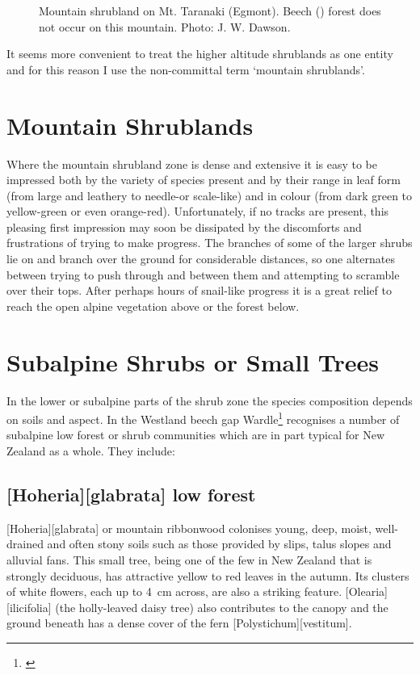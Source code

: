 \begin{figure}[htb]
\begin{minipage}[t]{0.284\textwidth}
    	\caption[Mountain shrubland on Mt.
    	Taranaki]{Mountain shrubland on Mt.
    	Taranaki (Egmont).
    	Beech () forest does not occur on this mountain.
    	Photo: J. W. Dawson.}%
    	\label{fig:91shrubland}
	\end{minipage}
\end{figure}

It seems more convenient to treat the higher altitude shrublands as one entity and for this reason I use the non-committal term `mountain shrublands'.

\section{Mountain Shrublands}

Where the mountain shrubland zone is dense and extensive it is easy to be impressed both by the variety of species present and by their range in leaf form (from large and leathery to needle-or scale-like) and in colour (from dark green to yellow-green or even orange-red).
Unfortunately, if no tracks are present, this pleasing first impression may soon be dissipated by the discomforts and frustrations of trying to make progress.
The branches of some of the larger shrubs lie on and branch over the ground for considerable distances, so one alternates between trying to push through and between them and attempting to scramble over their tops.
After perhaps hours of snail-like progress it is a great relief to reach the open alpine vegetation above or the forest below.

\section{Subalpine Shrubs or Small Trees}

In the lower or subalpine parts of the shrub zone the species composition depends on soils and aspect.
In the Westland beech gap Wardle\footnote{\cite{wardle1977plant}} recognises a number of subalpine low forest or shrub communities which are in part typical for New Zealand as a whole.
They include:

\subsection[\emph{Hoheria glabrata} low forest]{[Hoheria][glabrata] low forest}

[Hoheria][glabrata] or mountain ribbonwood colonises young, deep, moist, well-drained and often stony soils such as those provided by slips, talus slopes and alluvial fans.
This small tree, being one of the few in New Zealand that is strongly deciduous, has attractive yellow to red leaves in the autumn.
Its clusters of white flowers, each up to \SI{4}{\centi\metre} across, are also a striking feature. [Olearia][ilicifolia] (the holly-leaved daisy tree) also contributes to the canopy and the ground beneath has a dense cover of the fern [Polystichum][vestitum].

